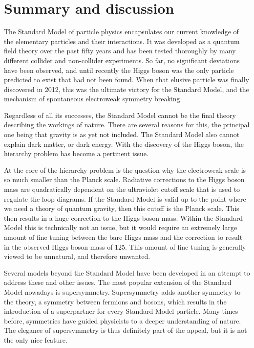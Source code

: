 \chapter{Summary and discussion \label{chap:summary}}

The Standard Model of particle physics encapsulates our current knowledge of the elementary
particles and their interactions. It was developed as a quantum field theory
over the past fifty years and has been tested thoroughly by many different collider and
non-collider experiments. So far, no significant deviations have been observed, and until recently
the Higgs boson was the only particle predicted to exist that had not been found. 
When that elusive particle was finally discovered in 2012, this was the ultimate victory for the
Standard Model, and the mechanism of spontaneous electroweak symmetry breaking. 

Regardless of all its successes, the Standard Model cannot be the final theory describing the
workings of nature. There are several reasons for this, the principal one being that gravity is
as yet not included. The Standard Model also cannot explain dark matter, or dark energy. 
With the discovery of the Higgs boson, the hierarchy problem has become a pertinent issue. 

At the core of the hierarchy problem is the question why the electroweak scale is so much smaller
than the Planck scale. Radiative corrections to the Higgs boson mass are quadratically dependent on
the ultraviolet cutoff scale that is used to regulate the loop diagrams. If the Standard Model is
valid up to the point where we need a theory of quantum gravity, then this cutoff is the
Planck scale. This then results in a huge correction to the Higgs boson mass. Within the Standard
Model this is technically not an issue, but it would require an extremely large amount of
fine tuning between the bare Higgs mass and the correction to result in the observed Higgs boson
mass of 125\GeV. This amount of fine tuning is generally viewed to be unnatural, and therefore
unwanted. 

Several models beyond the Standard Model have been developed in an attempt to address these and
other issues. The most popular extension of the Standard Model nowadays is supersymmetry.
Supersymmetry adds another symmetry to the theory, a symmetry between fermions and bosons, which
results in the introduction of a superpartner for every Standard Model particle. 
Many times before, symmetries have guided physicists to a deeper understanding of nature. 
The elegance of supersymmetry is thus definitely part of the appeal, but it is not the only nice
feature. 


